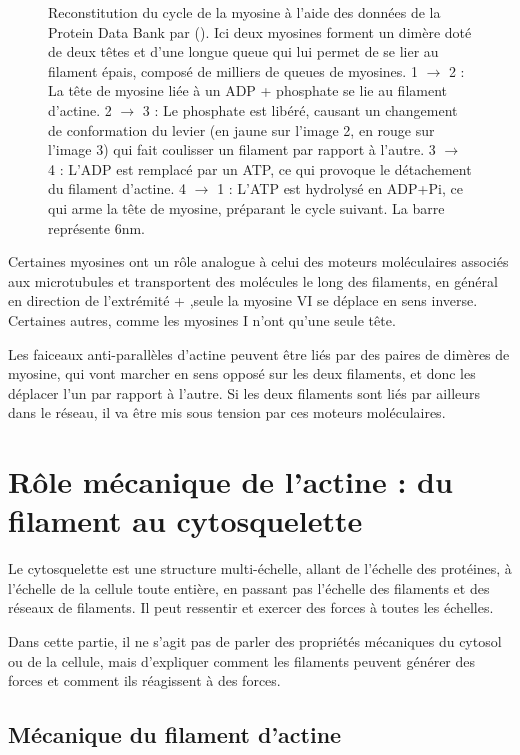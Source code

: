 \begin{figure}
\caption{Reconstitution du cycle de la myosine à l'aide des données de la Protein Data Bank par (\cite{vale_way_2000}). Ici deux myosines forment un dimère doté de deux têtes et d'une longue queue qui lui permet de se lier au filament épais, composé de milliers de queues de myosines.  1 $\rightarrow$ 2 : La tête de myosine liée à un ADP + phosphate se lie au filament d'actine. 2 $\rightarrow$ 3 : Le phosphate est libéré, causant un changement de conformation du levier (en jaune sur l'image 2, en rouge sur l'image 3) qui fait coulisser un filament par rapport à l'autre. 3 $\rightarrow$ 4 : L'ADP est remplacé par un ATP, ce qui provoque le détachement du filament d'actine. 4 $\rightarrow$ 1 : L'ATP est hydrolysé en ADP+Pi, ce qui arme la tête de myosine, préparant le cycle suivant. La barre représente 6nm. \label{myosin_cycle}}
\end{figure} 





Certaines myosines ont un rôle analogue à celui des moteurs moléculaires associés aux microtubules et transportent des molécules le long des filaments, en général en direction de l'extrémité + ,seule la myosine VI se déplace en sens inverse. Certaines autres, comme les myosines I n'ont qu'une seule tête. 


Les faiceaux anti-parallèles d'actine peuvent être liés par des paires de dimères de myosine, qui vont marcher en sens opposé sur les deux filaments, et donc les déplacer l'un par rapport à l'autre. Si les deux filaments sont liés par ailleurs dans le réseau, il va être mis sous tension par ces moteurs moléculaires. 




\section{Rôle mécanique de l'actine : du filament au cytosquelette}

Le cytosquelette est une structure multi-échelle, allant de l'échelle des protéines, à l'échelle de la cellule toute entière, en passant pas l'échelle des filaments et des réseaux de filaments. Il peut ressentir et exercer des forces à toutes les échelles. 


Dans cette partie, il ne s'agit pas de parler des propriétés mécaniques du cytosol ou de la cellule, mais d'expliquer comment les filaments peuvent générer des forces et comment ils réagissent à des forces. 

\subsection{Mécanique du filament d'actine}

